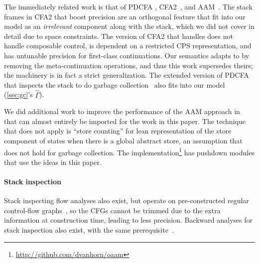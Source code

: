 The immediately related work is that of PDCFA \citep{dvanhorn:Earl2010Pushdown, dvanhorn:Earl2012Introspective}, CFA2~\citep{dvanhorn:Vardoulakis2011CFA2, dvanhorn:Vardoulakis2011Pushdown}, and AAM~\citep{dvanhorn:VanHorn2010Abstracting}.
%
The stack frames in CFA2 that boost precision are an orthogonal feature that fit into our model as an \emph{irrelevant} component along with the stack, which we did not cover in detail due to space constraints.
%
The version of CFA2 that handles  does not handle composable control, is dependent on a restricted CPS representation, and has untunable precision for first-class continuations.
%
Our semantics adapts to  by removing the meta-continuation operations, and thus this work supersedes theirs; the machinery is in fact a strict generalization.
%
The extended version of PDCFA that inspects the stack to do garbage collection~\citep{dvanhorn:Earl2012Introspective} also fits into our model (\autoref{sec:gc}'s $\hat\Gamma$).
%

We did additional work to improve the performance of the AAM approach in \citet{dvanhorn:Johnson2013Optimizing} that can almost entirely be imported for the work in this paper.
%
The technique that does not apply is ``store counting'' for lean representation of the store component of states when there is a global abstract store, an assumption that does not hold for garbage collection.
%
The implementation\footnote{\url{http://github.com/dvanhorn/oaam}} has pushdown modules that use the ideas in this paper.

\paragraph{Stack inspection}
Stack inspecting flow analyses also exist, but operate on pre-constructed regular control-flow graphs~\citep{ianjohnson:bartoletti2004stack}, so the CFGs cannot be trimmed due to the extra information at construction time, leading to less precision.
%
Backward analyses for stack inspection also exist, with the same prerequisite~\citep{ianjohnson:DBLP:journals/sigplan/Chang06}.

